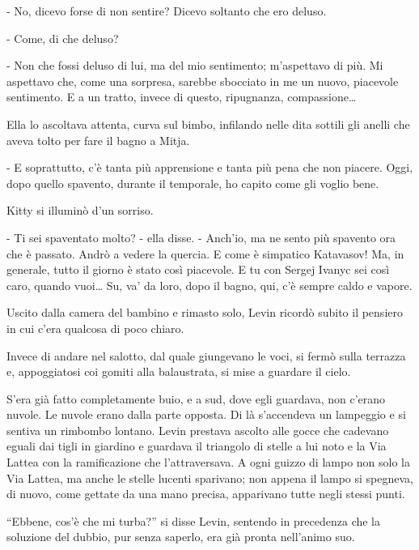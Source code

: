 - No, dicevo forse di non sentire? Dicevo soltanto che ero deluso. 

- Come, di che deluso? 

- Non che fossi deluso di lui, ma del mio sentimento; m'aspettavo di più. Mi aspettavo che, come una sorpresa, sarebbe sbocciato in me un nuovo, piacevole sentimento. E a un tratto, invece di questo, ripugnanza, compassione\ldots{} 

Ella lo ascoltava attenta, curva sul bimbo, infilando nelle dita sottili gli anelli che aveva tolto per fare il bagno a Mitja. 

- E soprattutto, c'è tanta più apprensione e tanta più pena che non piacere. Oggi, dopo quello spavento, durante il temporale, ho capito come gli voglio bene. 

Kitty si illuminò d'un sorriso. 

- Ti sei spaventato molto? - ella disse. - Anch'io, ma ne sento più spavento ora che è passato. Andrò a vedere la quercia. E come è simpatico Katavasov! Ma, in generale, tutto il giorno è stato così piacevole. E tu con Sergej Ivanyc sei così caro, quando vuoi\ldots{} Su, va' da loro, dopo il bagno, qui, c'è sempre caldo e vapore. 

\label{xix-7} 

Uscito dalla camera del bambino e rimasto solo, Levin ricordò subito il pensiero in cui c'era qualcosa di poco chiaro. 

Invece di andare nel salotto, dal quale giungevano le voci, si fermò sulla terrazza e, appoggiatosi coi gomiti alla balaustrata, si mise a guardare il cielo. 

S'era già fatto completamente buio, e a sud, dove egli guardava, non c'erano nuvole. Le nuvole erano dalla parte opposta. Di là s'accendeva un lampeggio e si sentiva un rimbombo lontano. Levin prestava ascolto alle gocce che cadevano eguali dai tigli in giardino e guardava il triangolo di stelle a lui noto e la Via Lattea con la ramificazione che l'attraversava. A ogni guizzo di lampo non solo la Via Lattea, ma anche le stelle lucenti sparivano; non appena il lampo si spegneva, di nuovo, come gettate da una mano precisa, apparivano tutte negli stessi punti. 

``Ebbene, cos'è che mi turba?'' si disse Levin, sentendo in precedenza che la soluzione del dubbio, pur senza saperlo, era già pronta nell'animo suo. 

